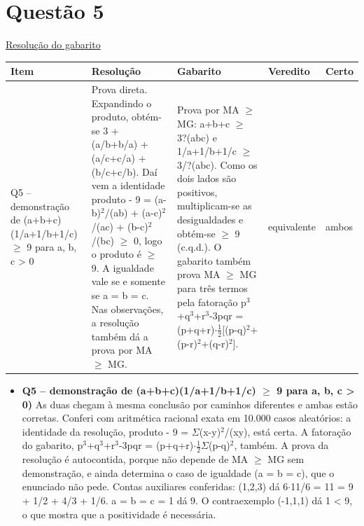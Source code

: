 \documentclass{article}%
\begin{document}
\section*{Questão 5}%
\href{https://poliedroresolve.sistemapoliedro.com.br/vestibulares/ime/2026/ime-2-fase-dia-1-23-10-2025-2-fase-dia-1/dissertativa-5-matematica-2-fase-dia-1-ime-2026}{Resolução do gabarito}\par\smallskip%
\begin{longtable}{@{}p{} p{} p{} p{} p{}@{}}\toprule Item & Resolução & Gabarito & Veredito & Certo \\ \midrule
Q5 -- demonstração de (a+b+c)(1/a+1/b+1/c) $\geq$ 9 para a, b, c > 0 & Prova direta. Expandindo o produto, obtém{-}se 3 + (a/b+b/a) + (a/c+c/a) + (b/c+c/b). Daí vem a identidade produto - 9 = (a-b)$^2$/(ab) + (a-c)$^2$/(ac) + (b-c)$^2$/(bc) $\geq$ 0, logo o produto é $\geq$ 9. A igualdade vale se e somente se a = b = c. Nas observações, a resolução também dá a prova por MA $\geq$ MG. & Prova por MA $\geq$ MG: a+b+c $\geq$ 3?(abc) e 1/a+1/b+1/c $\geq$ 3/?(abc). Como os dois lados são positivos, multiplicam{-}se as desigualdades e obtém{-}se $\geq$ 9 (c.q.d.). O gabarito também prova MA $\geq$ MG para três termos pela fatoração p$^3$+q$^3$+r$^3$-3pqr = (p+q+r)$\cdot$$\frac12${[}(p-q)$^2$+(p-r)$^2$+(q-r)$^2${]}. & equivalente & ambos \\
\bottomrule\end{longtable}%
\begin{itemize}%
\item%
\textbf{Q5 -- demonstração de (a+b+c)(1/a+1/b+1/c) $\geq$ 9 para a, b, c > 0)} As duas chegam à mesma conclusão por caminhos diferentes e ambas estão corretas. Conferi com aritmética racional exata em 10.000 casos aleatórios: a identidade da resolução, produto - 9 = $\Sigma$(x-y)$^2$/(xy), está certa. A fatoração do gabarito, p$^3$+q$^3$+r$^3$-3pqr = (p+q+r)$\cdot$$\frac12$$\Sigma$(p-q)$^2$, também. A prova da resolução é autocontida, porque não depende de MA $\geq$ MG sem demonstração, e ainda determina o caso de igualdade (a = b = c), que o enunciado não pede. Contas auxiliares conferidas: (1,2,3) dá 6$\cdot$11/6 = 11 = 9 + 1/2 + 4/3 + 1/6. a = b = c = 1 dá 9. O contraexemplo (-1,1,1) dá 1 < 9, o que mostra que a positividade é necessária.%
\end{itemize}%
\end{document}
